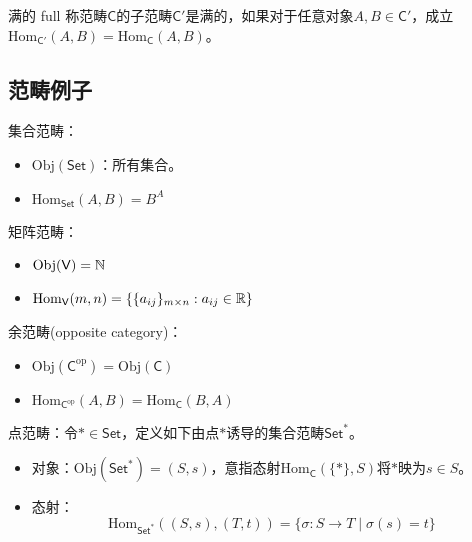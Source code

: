 \begin{definition}{满的 full}
	称范畴$\mathsf{C}$的子范畴$\mathsf{C}'$是满的，如果对于任意对象$A,B\in\mathsf{C'}$，成立$\mathrm{Hom}_\mathsf{C'}(A,B)=\mathrm{Hom}_\mathsf{C}(A,B)$。
\end{definition}

\subsection{范畴例子}

\begin{example}
	集合范畴：
	\begin{itemize}
		\item $\mathrm{Obj}(\mathsf{Set})$：所有集合。
		\item $\mathrm{Hom}_{\mathsf{Set}}(A,B)=B^A$
	\end{itemize}
\end{example}
	
\begin{example}
	矩阵范畴：
	\begin{itemize}
		\item $\mathrm{Obj}(\mathsf{V})=\mathbb{N}$
		\item $\mathrm{Hom}_{\mathsf{V}}(m,n)=\{ \{a_{ij}\}_{m\times n}:a_{ij}\in\mathbb{R} \}$
	\end{itemize}
\end{example}

\begin{example}
	余范畴(opposite category)：
	\begin{itemize}
		\item $\mathrm{Obj}(\mathsf{C}^{\mathrm{op}})=\mathrm{Obj}(\mathsf{C})$
		\item $\mathrm{Hom}_{\mathsf{C}^{\mathrm{op}}}(A,B)=\mathrm{Hom}_{\mathsf{C}}(B,A)$
	\end{itemize}
\end{example}

\begin{example}
	点范畴：令$*\in\mathsf{Set}$，定义如下由点$*$诱导的集合范畴$\mathsf{Set}^*$。
	\begin{itemize}
		\item 对象：$\mathrm{Obj}(\mathsf{Set}^*)=(S,s)$，意指态射$\mathrm{Hom}_\mathsf{C}(\{*\},S)$将$*$映为$s\in S$。
		\item 态射：
		$$
		\mathrm{Hom}_{\mathsf{Set}^*}((S,s),(T,t))=\{ \sigma:S\to T\mid \sigma(s)=t \}
		$$
	\end{itemize}
\end{example}

